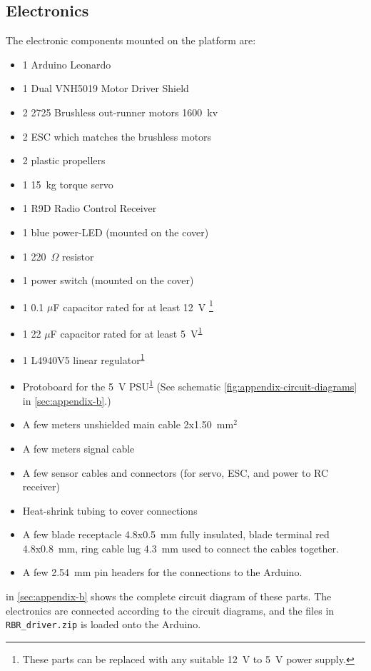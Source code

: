 \subsection{Electronics}\label{sec:appendix-electronics}
The electronic components mounted on the platform are:
\begin{itemize}
  \item 1 Arduino Leonardo
  \item 1 Dual VNH5019 Motor Driver Shield
  \item 2 2725 Brushless out-runner motors 1600~kv
  \item 2 ESC which matches the brushless motors
  \item 2 plastic propellers
  \item 1 15~kg torque servo
  \item 1 R9D Radio Control Receiver
  \item 1 blue power-LED (mounted on the cover)
  \item 1 220~$\Omega$ resistor
  \item 1 power switch (mounted on the cover)
  \item 1 0.1 $\mu$F capacitor rated for at least 12~V \footnote{\label{fotnot_app} These parts can be replaced with any suitable 12~V to 5~V power supply.}
  \item 1 22 $\mu$F capacitor rated for at least 5~V\textsuperscript{\ref{fotnot_app}}
  \item 1 L4940V5 linear regulator\textsuperscript{\ref{fotnot_app}}
  \item Protoboard for the 5~V PSU\textsuperscript{\ref{fotnot_app}} (See schematic \cref{fig:appendix-circuit-diagrams} in \cref{sec:appendix-b}.)
  \item A few meters unshielded main cable 2x1.50~mm$^2$
  \item A few meters signal cable
  \item A few sensor cables and connectors (for servo, ESC, and power to RC receiver)
  \item Heat-shrink tubing to cover connections
  \item A few blade receptacle 4.8x0.5~mm fully insulated, blade terminal red
    4.8x0.8~mm, ring cable lug 4.3~mm used to connect the cables together.
  \item A few 2.54~mm pin headers for the connections to the Arduino.
\end{itemize}
  in \cref{sec:appendix-b} shows the complete circuit diagram of these parts. The electronics are connected according to the circuit diagrams, and the files in \texttt{RBR\_driver.zip} is loaded onto the Arduino.

